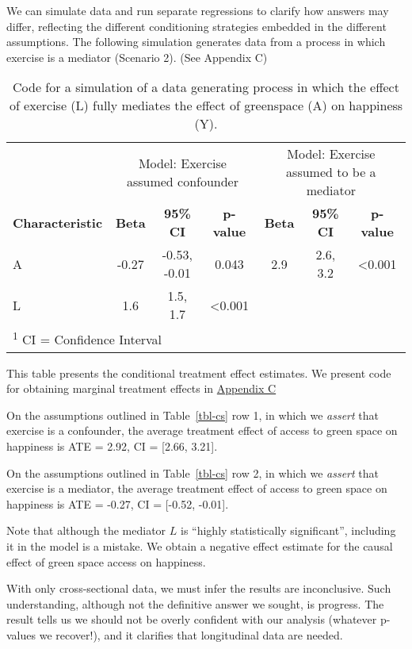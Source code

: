 \documentclass[
  single column]{article}
\begin{document}
We can simulate data and run separate regressions to clarify how answers
may differ, reflecting the different conditioning strategies embedded in
the different assumptions. The following simulation generates data from
a process in which exercise is a mediator (Scenario 2). (See Appendix C)

\begin{table}
\caption{Code for a simulation of a data generating process in which the effect
of exercise (L) fully mediates the effect of greenspace (A) on happiness
(Y).}\tabularnewline

\centering
\begin{tabular}{lcccccc}
\toprule
\multicolumn{1}{c}{ } & \multicolumn{3}{c}{Model: Exercise assumed confounder} & \multicolumn{3}{c}{Model: Exercise assumed to be a mediator} \\
\cmidrule(l{3pt}r{3pt}){2-4} \cmidrule(l{3pt}r{3pt}){5-7}
\textbf{Characteristic} & \textbf{Beta} & \textbf{95\% CI} & \textbf{p-value} & \textbf{Beta} & \textbf{95\% CI} & \textbf{p-value}\\
\midrule
A & -0.27 & -0.53, -0.01 & 0.043 & 2.9 & 2.6, 3.2 & <0.001\\
L & 1.6 & 1.5, 1.7 & <0.001 &  &  & \\
\bottomrule
\multicolumn{7}{l}{\rule{0pt}{1em}\textsuperscript{1} CI = Confidence Interval}\\
\end{tabular}
\end{table}

This table presents the conditional treatment effect estimates. We
present code for obtaining marginal treatment effects in
\hyperref[appendix-c]{Appendix C}

On the assumptions outlined in Table~\ref{tbl-cs} row 1, in which we
\emph{assert} that exercise is a confounder, the average treatment
effect of access to green space on happiness is ATE = 2.92, CI =
{[}2.66, 3.21{]}.

On the assumptions outlined in Table~\ref{tbl-cs} row 2, in which we
\emph{assert} that exercise is a mediator, the average treatment effect
of access to green space on happiness is ATE = -0.27, CI = {[}-0.52,
-0.01{]}.

Note that although the mediator \(L\) is ``highly statistically
significant'', including it in the model is a mistake. We obtain a
negative effect estimate for the causal effect of green space access on
happiness.

With only cross-sectional data, we must infer the results are
inconclusive. Such understanding, although not the definitive answer we
sought, is progress. The result tells us we should not be overly
confident with our analysis (whatever p-values we recover!), and it
clarifies that longitudinal data are needed.
\end{document}
